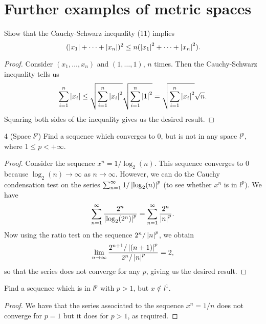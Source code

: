 \section{Further examples of metric spaces}


\begin{exercise}{3}
Show that the Cauchy-Schwarz inequality (11) implies 
\[
(\left\lvert x_1\right\rvert+\dots+\left\lvert x_n\right\rvert)^2 
\leq n (\left\lvert x_1\right\rvert^2+\dots+\left\lvert x_n\right\rvert^2).
\]
\end{exercise}
\begin{proof}
Consider $(x_1,\dots,x_n)$ and $(1,\dots,1)$, $n$ times. Then the Cauchy-Schwarz inequality tells us
\[
\sum^n_{i=1}\left\lvert x_i\right\rvert \leq
\sqrt{\sum_{i=1}^n\left\lvert x_i\right\rvert^2}\sqrt{\sum_{i=1}^n\left\lvert 1\right\rvert^2} 
=\sqrt{\sum_{i=1}^n\left\lvert x_i\right\rvert^2}\sqrt{n}.
\]
Squaring both sides of the inequality gives us the desired result.
\end{proof}

\begin{exercise}{4 (Space $l^p$)}
Find a sequence which converges to 0, but is not in any space $l^p$, where $1\leq p<+\infty$.
\end{exercise}
\begin{proof}
Consider the sequence $x^n=1/\log_2(n)$. This sequence converges to 0 because $\log_2(n)\to\infty$ as $n\to\infty$. However, we can do the Cauchy condensation test on the series $\sum_{n=1}^\infty 1/\left\lvert \log_2(n)\right\rvert^p$ (to see whether $x^n$ is in $l^p$). We have 
\begin{align*}
    \sum_{n=1}^\infty \frac{2^n}{\left\lvert \log_2(2^n)\right\rvert^p} 
    =\sum_{n=1}^\infty \frac{2^n}{\left\lvert n\right\rvert^p}.
\end{align*}
Now using the ratio test on the sequence $2^n/\left\lvert n\right\rvert^p$, we obtain
\[
\lim_{n\to\infty}\frac{2^{n+1}/\left\lvert (n+1)\right\rvert^p}{2^n/\left\lvert n\right\rvert^p} =2,
\]
so that the series does not converge for any $p$, giving us the desired result.
\end{proof}

\begin{exercise}{5}
Find a sequence which is in $l^p$ with $p>1$, but $x\notin l^1$.
\end{exercise}
\begin{proof}
We have that the series associated to the sequence $x^n=1/n$ does not converge for $p=1$ but it does for $p>1$, as required.
\end{proof}

